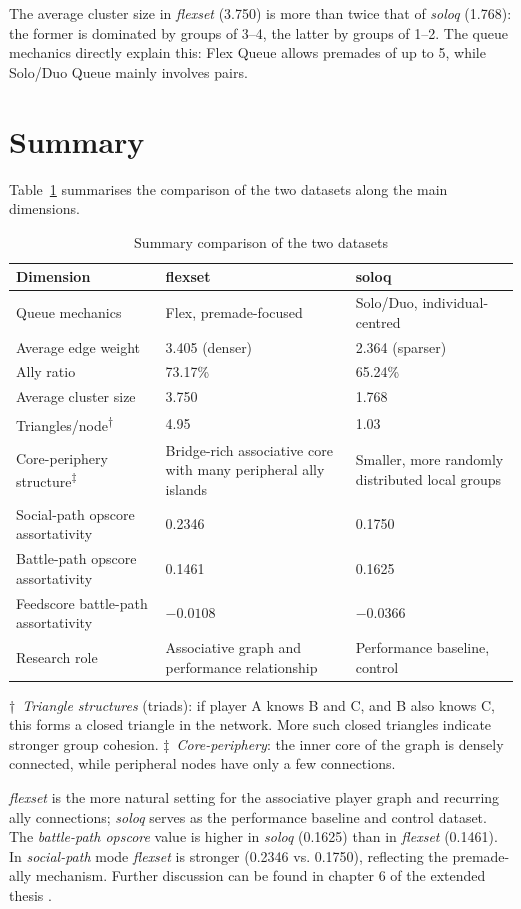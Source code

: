 The average cluster size in \textit{flexset} (3.750) is more than twice that of \textit{soloq} (1.768): the former is dominated by groups of 3--4, the latter by groups of 1--2. The queue mechanics directly explain this: Flex Queue allows premades of up to 5, while Solo/Duo Queue mainly involves pairs.

\section{Summary}

Table~\ref{tab:dataset-summary} summarises the comparison of the two datasets along the main dimensions.

\begin{table}[H]
\centering
\caption{Summary comparison of the two datasets}
\label{tab:dataset-summary}
\begin{tabularx}{\textwidth}{|>{\raggedright\arraybackslash}p{5cm}|X|X|}
\hline
\textbf{Dimension} & \textbf{flexset} & \textbf{soloq} \\
\hline
Queue mechanics & Flex, premade-focused & Solo/Duo, individual-centred \\
Average edge weight & 3.405 (denser) & 2.364 (sparser) \\
Ally ratio & 73.17\% & 65.24\% \\
Average cluster size & 3.750 & 1.768 \\
Triangles/node\textsuperscript{†} & 4.95 & 1.03 \\
Core-periphery structure\textsuperscript{‡} & Bridge-rich associative core with many peripheral ally islands & Smaller, more randomly distributed local groups \\
Social-path opscore assortativity & 0.2346 & 0.1750 \\
Battle-path opscore assortativity & 0.1461 & 0.1625 \\
Feedscore battle-path assortativity & $-0.0108$ & $-0.0366$ \\
Research role & Associative graph and performance relationship & Performance baseline, control \\
\hline
\end{tabularx}
\end{table}

\noindent\small{†~\textit{Triangle structures} (triads): if player A knows B and C, and B also knows C, this forms a closed triangle in the network. More such closed triangles indicate stronger group cohesion. \quad ‡~\textit{Core-periphery}: the inner core of the graph is densely connected, while peripheral nodes have only a few connections.}\normalsize

\medskip
\textit{flexset} is the more natural setting for the associative player graph and recurring ally connections; \textit{soloq} serves as the performance baseline and control dataset. The \textit{battle-path opscore} value is higher in \textit{soloq} (0.1625) than in \textit{flexset} (0.1461). In \textit{social-path} mode \textit{flexset} is stronger (0.2346 vs. 0.1750), reflecting the premade-ally mechanism. Further discussion can be found in chapter 6 of the extended thesis \cite{premadegraph-full}.
